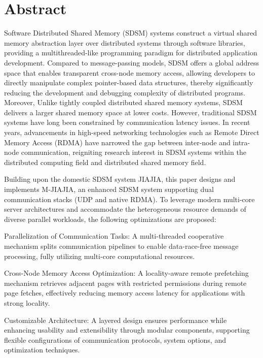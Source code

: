 \intobmk\chapter*{Abstract}%
Software Distributed Shared Memory (SDSM) systems construct a virtual shared memory abstraction layer over distributed systems through software libraries, providing a multithreaded-like programming paradigm for distributed application development. Compared to message-passing models, SDSM offers a global address space that enables transparent cross-node memory access, allowing developers to directly manipulate complex pointer-based data structures, thereby significantly reducing the development and debugging complexity of distributed programs. Moreover, Unlike tightly coupled distributed shared memory systems, SDSM delivers a larger shared memory space at lower costs. However, traditional SDSM systems have long been constrained by communication latency issues. In recent years, advancements in high-speed networking technologies such as Remote Direct Memory Access (RDMA) have narrowed the gap between inter-node and intra-node communication, reigniting research interest in SDSM systems within the distributed computing field and distributed shared memory field.

Building upon the domestic SDSM system JIAJIA, this paper designs and implements M-JIAJIA, an enhanced SDSM system supporting dual communication stacks (UDP and native RDMA). To leverage modern multi-core server architectures and accommodate the heterogeneous resource demands of diverse parallel workloads, the following optimizations are proposed:

\begin{enumerate}[label=\arabic*.]{
    \item Parallelization of Communication Tasks: A multi-threaded cooperative mechanism splits communication pipelines to enable data-race-free message processing, fully utilizing multi-core computational resources.

    \item Cross-Node Memory Access Optimization: A locality-aware remote prefetching mechanism retrieves adjacent pages with restricted permissions during remote page fetches, effectively reducing memory access latency for applications with strong locality.

    \item Customizable Architecture: A layered design
          ensures performance while enhancing usability and extensibility through modular components, supporting flexible configurations of communication protocols, system options, and optimization techniques.
          }
\end{enumerate}


